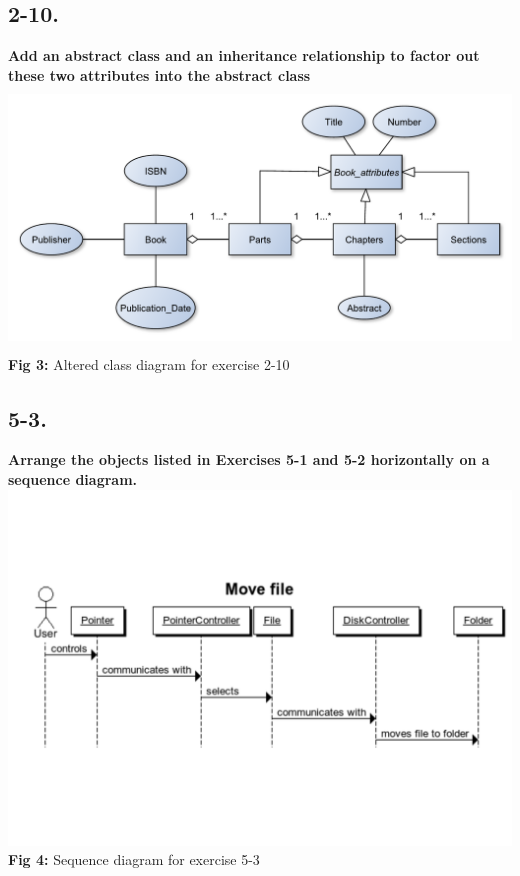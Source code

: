\documentclass[12pt]{article}
\begin{document}
\newpage
\subsection*{2-10.}
\textbf{Add an abstract class and an inheritance relationship to factor out these two attributes into the abstract class}\\

\includegraphics[height=70mm]{2-10}\\
\textbf{Fig 3:} Altered class diagram for exercise 2-10










\newpage
\subsection*{5-3.}
\textbf{Arrange the objects listed in Exercises 5-1 and 5-2 horizontally on a sequence diagram.}\\
\includegraphics[scale=0.5]{5-3}\\
\textbf{Fig 4:} Sequence diagram for exercise 5-3
\end{document}
